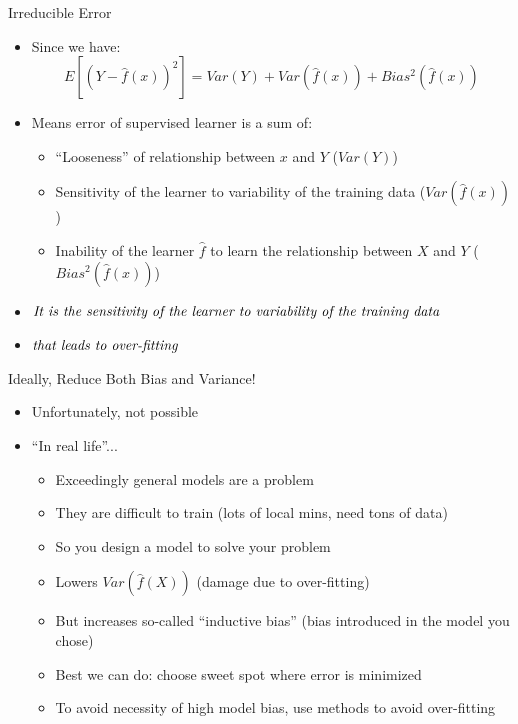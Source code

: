 \documentclass[aspectratio=169]{beamer}
\begin{document}
\begin{frame}{Irreducible Error}

\begin{itemize}
	\item Since we have:
	$$E[(Y - \hat{f}(x))^2] = Var(Y) + Var(\hat{f}(x)) + Bias^2(\hat{f}(x))$$
	\item Means error of supervised learner is a sum of:
	\begin{itemize}
	\item ``Looseness'' of relationship between $x$ and $Y$ ($Var(Y)$)
	\item Sensitivity of the learner to variability of the training data ($Var(\hat{f}(x))$)
	\item Inability of the learner $\hat{f}$ to learn the relationship between $X$ and $Y$ ($Bias^2(\hat{f}(x))$)
	\end{itemize}
\item $\textrm{\textit{It is the sensitivity of the learner to variability of the training data}}$
\item $\textrm{\textit{that leads to over-fitting}}$
\end{itemize}
\end{frame}

		
\begin{frame}{Ideally, Reduce Both Bias and Variance!}

\begin{itemize}
\item Unfortunately, not possible
\item ``In real life''...
	\begin{itemize}
	\item Exceedingly general models are a problem
	\item They are difficult to train (lots of local mins, need tons of data)
	\item So you design a model to solve your problem
	\item Lowers $Var(\hat{f}(X))$ (damage due to over-fitting)
	\item But increases so-called ``inductive bias'' (bias introduced in the model you chose)
	\item Best we can do: choose sweet spot where error is minimized
	\item To avoid necessity of high model bias, use methods to avoid over-fitting
	\end{itemize}
\end{itemize}
\end{frame}
\end{document}
